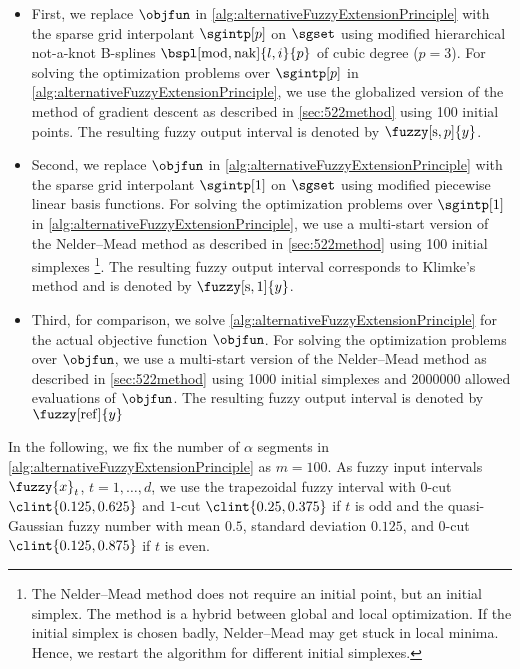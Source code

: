 \begin{itemize}
  \item
  First,
  we replace $\objfun$ in \cref{alg:alternativeFuzzyExtensionPrinciple}
  with the sparse grid interpolant $\sgintp[p]$
  on $\sgset$ using modified hierarchical not-a-knot B-splines
  $\bspl[\modified,\nak]{l,i}{p}$ of cubic degree ($p = 3$).
  For solving the optimization problems over $\sgintp[p]$ in
  \cref{alg:alternativeFuzzyExtensionPrinciple},
  we use the globalized version of the method of gradient descent
  as described in \cref{sec:522method} using 100 initial points.
  The resulting fuzzy output interval is denoted by $\fuzzy[\sparse,p]{y}$.
  
  \item
  Second,
  we replace $\objfun$ in \cref{alg:alternativeFuzzyExtensionPrinciple}
  with the sparse grid interpolant $\sgintp[1]$
  on $\sgset$ using modified piecewise linear basis functions.
  For solving the optimization problems over $\sgintp[1]$ in
  \cref{alg:alternativeFuzzyExtensionPrinciple},
  we use a multi-start version of the Nelder--Mead method
  as described in \cref{sec:522method}
  using 100 initial simplexes%
  \footnote{%
    The Nelder--Mead method does not require an initial point,
    but an initial simplex.
    The method is a hybrid between global and local optimization.
    If the initial simplex is chosen badly, Nelder--Mead may get stuck
    in local minima.
    Hence, we restart the algorithm for different initial simplexes.%
  }.
  The resulting fuzzy output interval corresponds to Klimke's method and
  is denoted by $\fuzzy[\sparse,1]{y}$.
  
  \item
  Third,
  for comparison, we solve
  \cref{alg:alternativeFuzzyExtensionPrinciple} for the
  actual objective function $\objfun$.
  For solving the optimization problems over $\objfun$,
  we use a multi-start version of the Nelder--Mead method
  as described in \cref{sec:522method}
  using 1000 initial simplexes
  and \num{2000000} allowed evaluations of $\objfun$.
  The resulting fuzzy output interval is denoted by $\fuzzy[\reference]{y}$
\end{itemize}

In the following, we fix the number of $\alpha$ segments
in \cref{alg:alternativeFuzzyExtensionPrinciple} as $m = 100$.
As fuzzy input intervals $\fuzzy{x}_t$, $t = 1, \dotsc, d$, we use
the trapezoidal fuzzy interval with $0$-cut $\clint{0.125, 0.625}$
and $1$-cut $\clint{0.25, 0.375}$ if $t$ is odd and
the quasi-Gaussian fuzzy number with mean $0.5$, standard deviation $0.125$,
and $0$-cut $\clint{0.125, 0.875}$ if $t$ is even.

